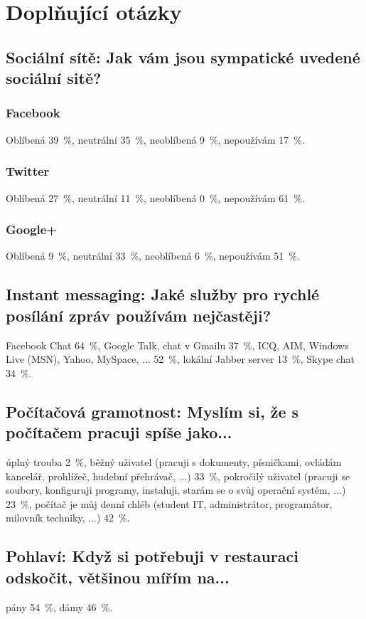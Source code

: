 \documentclass[12pt,oneside,final]{fithesis2}
\begin{document}
\section{Doplňující otázky}

\subsection*{Sociální sítě: Jak vám jsou sympatické uvedené sociální sitě?}
\subsubsection*{Facebook}
Oblíbená 39~\%,
neutrální 35~\%,
neoblíbená 9~\%,
nepoužívám 17~\%.

\subsubsection*{Twitter}
Oblíbená 27~\%,
neutrální 11~\%,
neoblíbená 0~\%,
nepoužívám 61~\%.

\subsubsection*{Google+}
Oblíbená 9~\%,
neutrální 33~\%,
neoblíbená 6~\%,
nepoužívám 51~\%.

\subsection*{Instant messaging: Jaké služby pro rychlé posílání zpráv používám nejčastěji?}
Facebook Chat 64~\%,
Google Talk, chat v Gmailu 37~\%,
ICQ, AIM, Windows Live (MSN), Yahoo, MySpace, ... 52~\%,
lokální Jabber server 13~\%,
Skype chat 34~\%.

\subsection*{Počítačová gramotnost: Myslím si, že s počítačem pracuji spíše jako...}
úplný trouba 2~\%,
běžný uživatel (pracuji s dokumenty, písničkami, ovládám kancelář, prohlížeč, hudební přehrávač, ...) 33~\%,
pokročilý uživatel (pracuji se soubory, konfiguruji programy, instaluji, starám se o svůj operační systém, ...) 23~\%,
počítač je můj denní chléb (student IT, administrátor, programátor, milovník techniky, ...) 42~\%.

\subsection*{Pohlaví: Když si potřebuji v restauraci odskočit, většinou mířím na...}
pány 54~\%,
dámy 46~\%.
\end{document}
